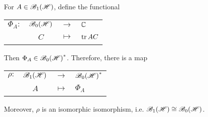 \begin{thm}
	For $A \in \mathscr{B}_{1}\mathscr{(H)}$, define the functional
	\begin{center}
		\begin{tabular}{l c c l}
			$\Phi_A \colon$ & $\mathscr{B}_{0}\mathscr{(H)}$ & $\longrightarrow$ & $\mathbb{C}$ \\
			~ & $C$ & $\longmapsto$ & $\operatorname{tr}{AC}$
		\end{tabular}
	\end{center}
	Then $\Phi_A \in \mathscr{B}_{0}\mathscr{(H)}^{*}$. Therefore, there is a map
	\begin{center}
		\begin{tabular}{l c c l}
			$\rho \colon$ & $\mathscr{B}_{1}\mathscr{(H)}$ & $\longrightarrow$ & $\mathscr{B}_{0}\mathscr{(H)}^{*}$ \\
			~ & $A$ & $\longmapsto$ & $\Phi_A$
		\end{tabular}
	\end{center}
	Moreover, $\rho$ is an isomorphic isomorphism, i.e. $\mathscr{B}_{1}\mathscr{(H)} \cong \mathscr{B}_{0}\mathscr{(H)}$. 
\end{thm}
